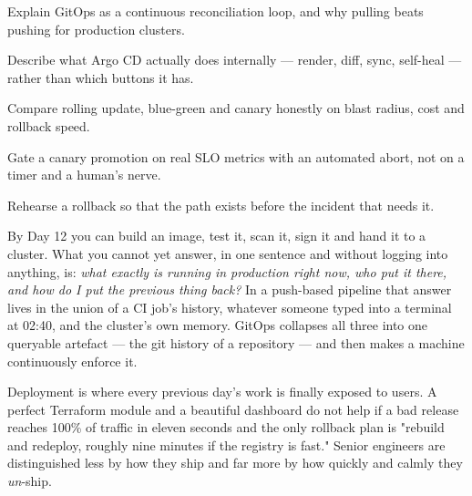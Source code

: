 
\begin{objectives}
\begin{wbitem}
  \item Explain GitOps as a continuous reconciliation loop, and why pulling beats pushing for production clusters.
  \item Describe what Argo CD actually does internally --- render, diff, sync, self-heal --- rather than which buttons it has.
  \item Compare rolling update, blue-green and canary honestly on blast radius, cost and rollback speed.
  \item Gate a canary promotion on real SLO metrics with an automated abort, not on a timer and a human's nerve.
  \item Rehearse a rollback so that the path exists before the incident that needs it.
\end{wbitem}
\end{objectives}


 By Day 12 you can build an image, test it, scan it, sign it and hand it to a cluster. What you cannot yet answer, in one sentence and without logging into anything, is: \emph{what exactly is running in production right now, who put it there, and how do I put the previous thing back?} In a push-based pipeline that answer lives in the union of a CI job's history, whatever someone typed into a terminal at 02:40, and the cluster's own memory. GitOps collapses all three into one queryable artefact --- the git history of a repository --- and then makes a machine continuously enforce it.

 Deployment is where every previous day's work is finally exposed to users. A perfect Terraform module and a beautiful dashboard do not help if a bad release reaches 100\% of traffic in eleven seconds and the only rollback plan is "rebuild and redeploy, roughly nine minutes if the registry is fast." Senior engineers are distinguished less by how they ship and far more by how quickly and calmly they \emph{un}-ship.

